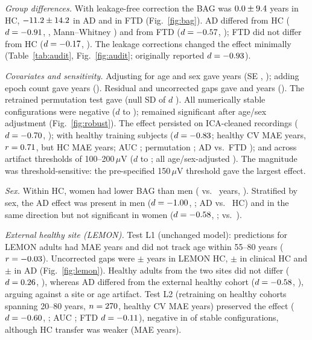 \documentclass[journal]{IEEEtran}
\begin{document}
\emph{Group differences.} With leakage-free correction the BAG was $0.0{}\pm9.4{}$ years in HC, $-11.2{}\pm14.2{}$ in AD and \bagFTD{} in FTD (Fig.~\ref{fig:bag}). AD differed from HC ($d=-0.91{}$, \bagDci{}, Mann--Whitney \bagMwuP{}) and from FTD ($d=-0.57{}$, \bagADFTDp{}); FTD did not differ from HC ($d=-0.17{}$, \bagFTDp{}). The leakage corrections changed the effect minimally (Table~\ref{tab:audit}, Fig.~\ref{fig:audit}; originally reported $d=-0.93{}$).

\emph{Covariates and sensitivity.} Adjusting for age and sex gave \adjCoef{} years (SE \adjSE{}, \adjP{}); adding epoch count gave \adjECoef{} years (\adjEP{}). Residual and uncorrected gaps gave \resCoef{} and \rawCoef{} years (\rawP{}). The retrained permutation test gave \bagPermP{} (null SD of $d$ \bagPermNullSD{}). All \nStable{} numerically stable configurations were negative ($d$ \stableLo{} to \stableHi{}); \nStableSig{} remained significant after age/sex adjustment (Fig.~\ref{fig:robust}). The effect persisted on ICA-cleaned recordings ($d=-0.70{}$, \icaP{}); with \repN{} healthy training subjects ($d=-0.83{}$; healthy CV MAE \repDmMAE{} years, $r=0.71{}$, but HC MAE \repHCMAE{} years; AUC \repAUC{}; permutation \repPermP{}; AD vs.\ FTD \repADFTDp{}); and across artifact thresholds of 100--200\,$\mu$V ($d$ \thrDlo{} to \thrDhi{}; all age/sex-adjusted \thrAdjMaxP{}). The magnitude was threshold-sensitive: the pre-specified 150\,$\mu$V threshold gave the largest effect.

\emph{Sex.} Within HC, women had lower BAG than men (\hcFem{} vs.\ \hcMale{} years, \hcSexP{}). Stratified by sex, the AD effect was present in men ($d=-1.00{}$, \stratMaleP{}; \stratMalenAD{} AD vs.\ \stratMalenHC{} HC) and in the same direction but not significant in women ($d=-0.58{}$, \stratFemP{}; \stratFemnAD{} vs.\ \stratFemnHC{}).

\emph{External healthy site (LEMON).} Test L1 (unchanged model): predictions for \lemN{} LEMON adults had MAE \lemMAE{} years and did not track age within 55--80 years ($r=-0.03{}$). Uncorrected gaps were \rawGapLem{}$\pm$\rawGapLemsd{} years in LEMON HC, \rawGapHc{}$\pm$\rawGapHcsd{} in clinical HC and \rawGapAd{}$\pm$\rawGapAdsd{} in AD (Fig.~\ref{fig:lemon}). Healthy adults from the two sites did not differ ($d=0.26{}$, \lemHCp{}), whereas AD differed from the external healthy cohort ($d=-0.58{}$, \lemADp{}), arguing against a site or age artifact. Test L2 (retraining on healthy cohorts spanning 20--80 years, $n=270{}$, healthy CV MAE \ltwoMAE{} years) preserved the effect ($d=-0.60{}$, \ltwoP{}; AUC \ltwoAUC{}; FTD $d=-0.11{}$), negative in \ltwoStableYounger{} of \ltwoStable{} stable configurations, although HC transfer was weaker (MAE \ltwoHCMAE{} years).
\end{document}
